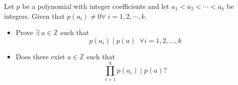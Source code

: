 Let $p$ be a polynomial with integer coeﬃcients and let $a_1<a_2<\cdots <a_k$ be integers. Given that $p(a_i)\ne 0\forall\; i=1,2,\cdots, k$.
\begin{itemize}
  \item Prove $\exists\; a\in \mathbb{Z}$ such that \[ p(a_i)\mid p(a)\;\;\forall i=1,2,\dots ,k \]
  \item Does there exist $a\in \mathbb{Z}$ such that \[ \prod_{i=1}^{k}p(a_i)\mid p(a)?\]
\end{itemize}
